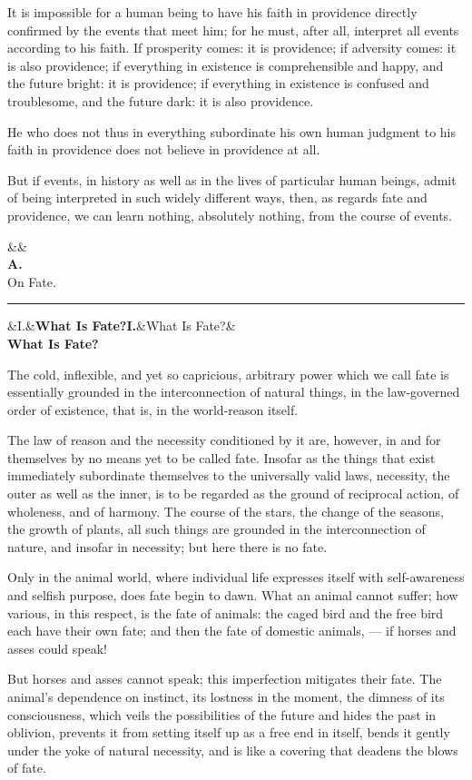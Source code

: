\documentclass[12pt,a4paper,openany]{book}
\newcommand{\opage}[1]{\marginnote{\footnotesize\textit{[#1]}}}
\newcommand{\afdeling}[3][]{\begin{center}\ifx&#1&\else#1\\[0.6em]\fi\textbf{#2}\\[0.3em]{\Large #3}\\[0.3em]\rule{3em}{0.4pt}\end{center}\addcontentsline{toc}{section}{#2 #3}}
\newcommand{\stykke}[2]{\begin{center}\ifx&#1&\textbf{#2}\else\textbf{#1}\ifx&#2&\else\\[0.2em]\textbf{#2}\fi\fi\end{center}}
\begin{document}
It is impossible for a human being to have his faith
in providence directly confirmed by the events
that meet him; for he must, after all, interpret all events
according to his faith. If prosperity comes: it is providence;
if adversity comes: it is also providence; if everything in
existence is comprehensible and happy, and the future bright:
it is providence; if everything in existence is confused and
troublesome, and the future dark: it is also providence.

He who does not thus in everything subordinate his own
human judgment to his faith in providence does not
believe in providence at all.

But if events, in history as well as
in the lives of particular human beings, admit of being interpreted in such
widely different ways, then, as regards fate
and providence, we can learn nothing, absolutely nothing, from the
course of events.

\setcounter{footnote}{0}%
\opage{5}\afdeling{A.}{On Fate.}
\stykke{I.}{What Is Fate?}

The cold, inflexible, and yet so capricious,
arbitrary power which we call fate is essentially
grounded in the interconnection of natural things,
in the law-governed order of existence,
that is, in the world-reason itself.

The law of reason and the necessity conditioned by it
are, however, in and for themselves by no
means yet to be called fate. Insofar as the
things that exist immediately subordinate themselves to the
universally valid laws, necessity, the
outer as well as the inner, is to be regarded as the ground of reciprocal action,
of wholeness, and of harmony.
The course of the stars, the change of the seasons,
\setcounter{footnote}{0}%
\opage{6}the growth of plants, all such things are grounded in the interconnection of nature,
and insofar in necessity;
but here there is no fate.

Only in the animal world, where individual
life expresses itself with self-awareness and selfish
purpose, does fate begin to dawn. What
an animal cannot suffer; how various, in
this respect, is the fate of animals: the caged
bird and the free bird each have their own fate;
and then the fate of domestic animals, --- if horses
and asses could speak!

But horses and asses cannot speak; this
imperfection mitigates their fate. The animal's
dependence on instinct, its lostness
in the moment, the dimness of its consciousness, which
veils the possibilities of the future and hides the
past in oblivion, prevents it from
setting itself up as a free end in itself, bends it gently
under the yoke of natural necessity, and is like
a covering that deadens the blows of fate.
\end{document}
